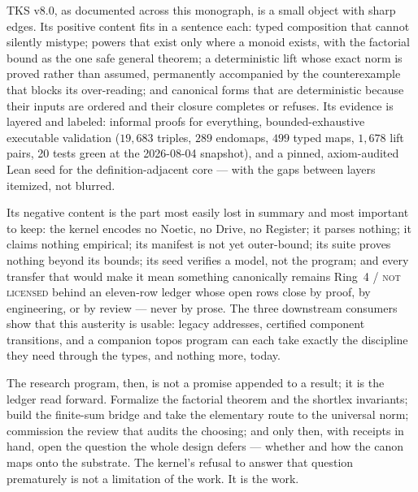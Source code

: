 TKS v8.0, as documented across this monograph, is a small object with
sharp edges. Its positive content fits in a sentence each: typed
composition that cannot silently mistype; powers that exist only where
a monoid exists, with the factorial bound as the one safe general
theorem; a deterministic lift whose exact norm is proved rather than
assumed, permanently accompanied by the counterexample that blocks its
over-reading; and canonical forms that are deterministic because their
inputs are ordered and their closure completes or refuses. Its
evidence is layered and labeled: informal proofs for everything,
bounded-exhaustive executable validation ($19{,}683$ triples, $289$
endomaps, $499$ typed maps, $1{,}678$ lift pairs, 20 tests green at
the 2026-08-04 snapshot), and a pinned, axiom-audited Lean seed for
the definition-adjacent core --- with the gaps between layers
itemized, not blurred.

Its negative content is the part most easily lost in summary and most
important to keep: the kernel encodes no Noetic, no Drive, no
Register; it parses nothing; it claims nothing empirical; its
manifest is not yet outer-bound; its suite proves nothing beyond its
bounds; its seed verifies a model, not the program; and every
transfer that would make it mean something canonically remains
Ring~4 / \textsc{not licensed} behind an eleven-row ledger whose
open rows close by proof, by engineering, or by review --- never by
prose. The three downstream consumers show that this austerity is
usable: legacy addresses, certified component transitions, and a
companion topos program can each take exactly the discipline they
need through the types, and nothing more, today.

The research program, then, is not a promise appended to a result;
it is the ledger read forward. Formalize the factorial theorem and
the shortlex invariants; build the finite-sum bridge and take the
elementary route to the universal norm; commission the review that
audits the choosing; and only then, with receipts in hand, open the
question the whole design defers --- whether and how the canon maps
onto the substrate. The kernel's refusal to answer that question
prematurely is not a limitation of the work. It is the work.
